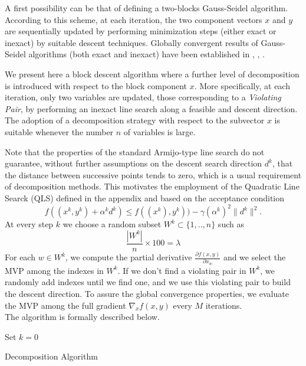A first possibility can be that of defining a two-blocks Gauss-Seidel algorithm.
According to this scheme, at each iteration, the two component vectors $x$ and $y$ are
sequentially updated by performing  minimization steps (either exact or inexact) by  suitable descent techniques.
Globally convergent results of Gauss-Seidel algorithms (both exact and inexact) have been established in \cite{}, \cite{}, \cite{}.

We present here a block descent algorithm where a further level of decomposition is
introduced with respect to the block component $x$. 
More specifically, at each iteration, only two variables are updated, those corresponding
to a {\it Violating Pair}, by performing an inexact line search along a feasible and descent direction.
The adoption of a decomposition strategy with respect to the subvector $x$ is suitable
whenever the number $n$ of variables is large.

Note that the properties of the standard Armijo-type line search do not guarantee, without further assumptions
on the descent search direction $d^k$, that the distance between successive points tends to zero, which is a usual requirement of decomposition methods. This motivates the employment of the Quadratic Line Searck (QLS) defined in the appendix and based on the acceptance condition
$$
f((x^k,y^k)+\alpha^kd^k)\le f((x^k),y^k))-\gamma (\alpha^k)^2\|d^k\|^2.
$$
At every step $k$ we choose a random subset $W^k\subset \{1,..,n\}$ such as
\begin{equation}\label{eq:lambda}
\frac{|W^k|}{n} \times 100 = \lambda
\end{equation}
For each $w \in W^k$, we compute the partial derivative $\frac{\partial f(x,y)}{\partial x_w}$ and we select the MVP among the indexes in $W^k$. If we don't find a violating pair in $W^k$, we randomly add indexes until we find one, and we use this violating pair to build the descent direction. To assure the global convergence properties, we evaluate the MVP among the full gradient $\nabla_x f(x,y)$ every $M$ iterations. \\
The algorithm is formally described below.

\begin{algorithm}[ht]
 Set $k = 0$\\
 \caption{Decomposition Algorithm}
 \label{alg:qls}
\end{algorithm}
